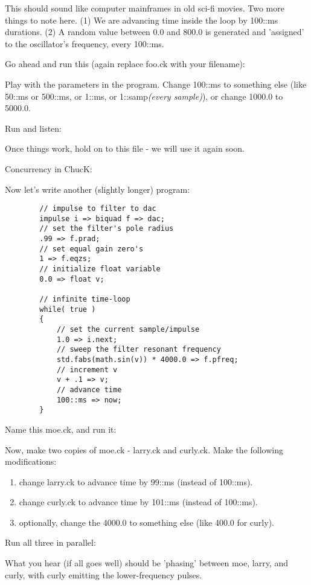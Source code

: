 This should sound like computer mainframes in old sci-fi movies. Two more things to note here. (1) We are advancing time inside the loop by 100::ms durations. (2) A random value between 0.0 and 800.0 is generated and 'assigned' to the oscillator's frequency, every 100::ms. 

Go ahead and run this (again replace foo.ck with your filename):

Play with the parameters in the program. Change 100::ms to something else (like 50::ms or 500::ms, or 1::ms, or 1::samp\textit{(every sample)}), or change 1000.0 to 5000.0. 

Run and listen:

Once things work, hold on to this file - we will use it again soon. 

Concurrency in ChucK: 

Now let's write another (slightly longer) program:
\begin{verbatim}
        // impulse to filter to dac
        impulse i => biquad f => dac;
        // set the filter's pole radius
        .99 => f.prad;
        // set equal gain zero's
        1 => f.eqzs;
        // initialize float variable
        0.0 => float v;

        // infinite time-loop
        while( true )
        {
            // set the current sample/impulse
            1.0 => i.next;
            // sweep the filter resonant frequency
            std.fabs(math.sin(v)) * 4000.0 => f.pfreq;
            // increment v
            v + .1 => v;
            // advance time
            100::ms => now;
        }
\end{verbatim}

Name this moe.ck, and run it:

Now, make two copies of moe.ck - larry.ck and curly.ck. Make the following modifications:
\begin{enumerate}
\item change larry.ck to advance time by 99::ms (instead of 100::ms).
\item change curly.ck to advance time by 101::ms (instead of 100::ms). 
\item optionally, change the 4000.0 to something else (like 400.0 for curly). 
\end{enumerate}

Run all three in parallel:

What you hear (if all goes well) should be 'phasing' between moe, larry, and curly, 
with curly emitting the lower-frequency pulses. 

